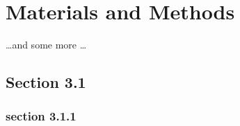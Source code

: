 \chapter{Materials and Methods}

\ifpdf
    \graphicspath{{Chapter3/Figs/}{Chapter3/Figs/PDF/}{Chapter3/Figs/}}
\else
    \graphicspath{{Chapter3/Figs/Vector/}{Chapter3/Figs/}}
\fi
\dots and some more \dots

\section{Section 3.1}
\label{section 3.1}
\subsection{section 3.1.1}